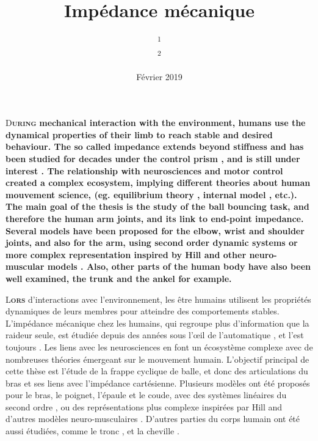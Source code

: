 \documentclass[12pt, a4paper]{article} %
\title{Impédance mécanique} %
\author{
	\authorstyle{Vincent FORTINEAU\textsuperscript{1,2}, Maria MAKAROV\textsuperscript{2}, Pedro RODRIGUEZ\textsuperscript{2}, Isabelle Siegler\textsuperscript{1}} %
	\newline\newline %
	\textsuperscript{1}\institution{Université Paris Sud - CIAMS}\\ %
	\textsuperscript{2}\institution{CentraleSupélec - L2S}\\ %
}
\date{Février 2019} %
\begin{document}
\maketitle %

\thispagestyle{firstpage} %


\lettrine{D}{\textbf{uring}} \textbf{mechanical interaction with the environment, humans use the dynamical properties of their limb to reach stable and desired behaviour. The so called impedance extends beyond stiffness and has been studied for decades under the control prism \citep{hogan_adaptive_1984}, and is still under interest \citep{mizrahi_mechanical_2015}. The relationship with neurosciences and motor control \citep{roberts_cerebellar_1996} created a complex ecosystem, implying different theories about human mouvement science, (eg. equilibrium theory \citep{flash_control_1987}, internal model \citep{hinder_case_2003, danion_we_2011}, etc.). The main goal of the thesis is the study of the ball bouncing task, and therefore the human arm joints, and its link to end-point impedance. Several models have been proposed for the elbow, wrist and shoulder joints, and also for the arm, using second order dynamic systems \citep{tsuji_human_1997} or more complex representation inspired by Hill and other neuro-muscular models \citep{puzi_mechanical_2017}. Also, other parts of the human body have also been well examined, the trunk \citep{smith_nonlinear_1994} and the ankel \citep{rouse_estimation_2014, ludvig_mechanisms_2017} for example.}

\estheticline

\lettrine{L}{\textbf{ors}} d'interactions avec l'environnement, les être humains utilisent les propriétés dynamiques de leurs membres pour atteindre des comportements stables. L'impédance mécanique chez les humains, qui regroupe plus d'information que la raideur seule, est étudiée depuis des années sous l'œil de l'automatique \citep{hogan_adaptive_1984}, et l'est toujours \citep{mizrahi_mechanical_2015}. Les liens avec les neurosciences \citep{roberts_cerebellar_1996} en font un écosystème complexe avec de nombreuses théories émergeant sur le mouvement humain. L'objectif principal de cette thèse est l'étude de la frappe cyclique de balle, et donc des articulations du bras et ses liens avec l'impédance cartésienne. Plusieurs modèles ont été proposés pour le bras, le poignet, l'épaule et le coude, avec des systèmes linéaires du second ordre \citep{tsuji_human_1997}, ou des représentations plus complexe inspirées par Hill and d'autres modèles neuro-musculaires \citep{puzi_mechanical_2017}. D'autres parties du corps humain ont été aussi étudiées, comme le tronc \citep{smith_nonlinear_1994}, et la cheville \citep{rouse_estimation_2014, ludvig_mechanisms_2017}.
\end{document}
